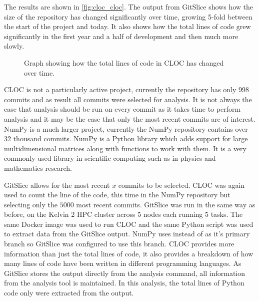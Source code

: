 The results are shown in \autoref{fig:cloc_cloc}.
The output from GitSlice shows how the size of the repository has changed significantly over time, growing 5-fold between the start of the project and today.
It also shows how the total lines of code grew significantly in the first year and a half of development and then much more slowly.

\begin{figure}
    \centering
    \caption{Graph showing how the total lines of code in CLOC has changed over time.}
    \label{fig:cloc_cloc}
\end{figure}

CLOC is not a particularly active project, currently the repository has only 998 commits and as result all commits were selected for analysis.
It is not always the case that analysis should be run on every commit as it takes time to perform analysis and it may be the case that only the most recent commits are of interest.
NumPy is a much larger project, currently the NumPy repository contains over 32 thousand commits.
NumPy is a Python library which adds support for large multidimensional matrices along with functions to work with them.
It is a very commonly used library in scientific computing such as in physics and mathematics research.

GitSlice allows for the most recent $ x $ commits to be selected.
CLOC was again used to count the line of the code, this time in the NumPy repository but selecting only the $ 5000 $ most recent commits.
GitSlice was run in the same way as before, on the Kelvin 2 HPC cluster across 5 nodes each running 5 tasks.
The same Docker image was used to run CLOC and the same Python script was used to extract data from the GitSlice output.
NumPy uses  instead of  as it's primary branch so GitSlice was configured to use this branch.
CLOC provides more information than just the total lines of code, it also provides a breakdown of how many lines of code have been written in different programming languages.
As GitSlice stores the output directly from the analysis command, all information from the analysis tool is maintained.
In this analysis, the total lines of Python code only were extracted from the output.

